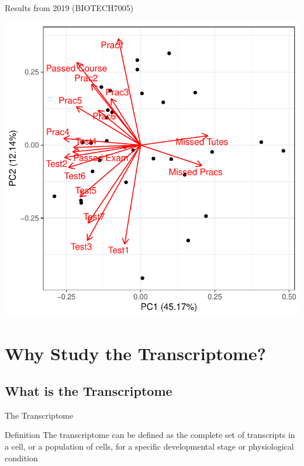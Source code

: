 \documentclass[11pt]{beamer}
\begin{document}
\begin{frame}{Results from 2019 (BIOTECH7005)}

	\begin{center}
	\includegraphics[scale=0.5]{figures/biotech7005_2019pca.pdf} 	
	\end{center}


\end{frame}

\section{Why Study the Transcriptome?}

\linespread{1.05}

\subsection{What is the Transcriptome}

\begin{frame}{The Transcriptome}

	\begin{block}{Definition}
	The transcriptome can be defined as the complete set of transcripts in a cell, or a population of cells, for a specific developmental stage or physiological condition
	\end{block}
	

\end{frame}
\end{document}
